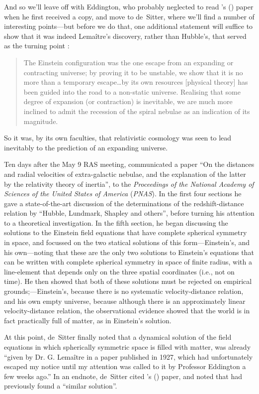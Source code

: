 \documentclass[12 pt]{article}
\def\citeapos#1{\citeauthor{#1}'s (\citeyear{#1})}
\begin{document}
And so we'll leave off with Eddington, who probably neglected to read \citeapos{Lemaitre1927} paper when he first received a copy, and move to de~Sitter, where we'll find a number of interesting points---but before we do that, one additional statement will suffice to show that it was indeed Lema\^{i}tre's discovery, rather than Hubble's, that served as the turning point \citep[p.~60]{Eddington1933}:
\begin{quotation}
The Einstein configuration was the one escape from an expanding or contracting universe; by proving it to be unstable, we show that it is no more than a temporary escape\ldots by its own resources [physical theory] has been guided into the road to a non-static universe. Realising that some degree of expansion (or contraction) is inevitable, we are much more inclined to admit the recession of the spiral nebulae as an indication of its magnitude.
\end{quotation}
So it was, by its own faculties, that relativistic cosmology was seen to lead inevitably to the prediction of an expanding universe.

Ten days after the May 9 RAS meeting, \citet{deSitter1930} communicated a paper ``On the distances and radial velocities of extra-galactic nebulae, and the explanation of the latter by the relativity theory of inertia'', to the \textit{Proceedings of the National Academy of Sciences of the United States of America} (\textit{PNAS}). In the first four sections he gave a state-of-the-art discussion of the determinations of the redshift-distance relation by ``Hubble, Lundmark, Shapley and others'', before turning his attention to a theoretical investigation. In the fifth section, he began discussing the solutions to the Einstein field equations that have complete spherical symmetry in space, and focussed on the two statical solutions of this form---Einstein's, and his own---noting that these are the only two solutions to Einstein's equations that can be written with complete spherical symmetry in space of finite radius, with a line-element that depends only on the three spatial coordinates (i.e., not on time). He then showed that both of these solutions must be rejected on empirical grounds;---Einstein's, because there is no systematic velocity-distance relation, and his own empty universe, because although there is an approximately linear velocity-distance relation, the observational evidence showed that the world is in fact practically full of matter, as in Einstein's solution.

At this point, de~Sitter finally noted that a dynamical solution of the field equations in which spherically symmetric space is filled with matter, was already ``given by Dr. G. Lema\^{i}tre in a paper published in 1927, which had unfortunately escaped my notice until my attention was called to it by Professor Eddington a few weeks ago.'' In an endnote, de~Sitter cited \citeapos{Lemaitre1927} paper, and noted that \citet{Friedmann1922} had previously found a ``similar solution''.
\end{document}
